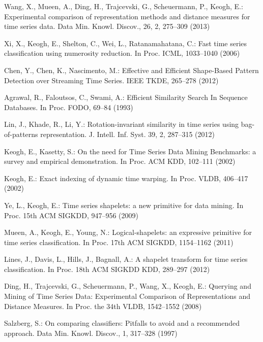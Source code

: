 \documentclass{llncs}
\begin{document}
\begin{thebibliography}{5}


Wang, X., Mueen, A., Ding, H., Trajcevski, G., Scheuermann, P., Keogh, E.:
Experimental comparison of representation methods and distance measures for time series data.
Data Min. Knowl. Discov., 26, 2, 275--309 (2013)

Xi, X., Keogh, E., Shelton, C., Wei, L., Ratanamahatana, C.:
Fast time series classification using numerosity reduction. 
In Proc. ICML, 1033--1040 (2006)

Chen, Y., Chen, K., Nascimento, M.:
Effective and Efficient Shape-Based Pattern Detection over Streaming Time Series. 
IEEE TKDE, 265--278 (2012)

Agrawal, R., Faloutsos, C., Swami, A.:
Efficient Similarity Search In Sequence Databases.
In Proc. FODO, 69--84 (1993)

Lin, J., Khade, R., Li, Y.:
Rotation-invariant similarity in time series using bag-of-patterns representation. 
J. Intell. Inf. Syst. 39, 2, 287--315 (2012)

Keogh, E., Kasetty, S.:
On the need for Time Series Data Mining Benchmarks: a survey and empirical demonstration.
In Proc. ACM KDD, 102--111 (2002)

Keogh, E.:
Exact indexing of dynamic time warping. 
In Proc. VLDB, 406--417 (2002)

Ye, L., Keogh, E.:
Time series shapelets: a new primitive for data mining.
In Proc. 15th ACM SIGKDD, 947--956 (2009)

Mueen, A., Keogh, E., Young, N.:
Logical-shapelets: an expressive primitive for time series classification.
In Proc. 17th ACM SIGKDD, 1154--1162 (2011)

Lines, J., Davis, L., Hills, J., Bagnall, A.:
A shapelet transform for time series classification. 
In Proc. 18th ACM SIGKDD KDD, 289--297 (2012)

Ding, H., Trajcevski, G., Scheuermann, P., Wang, X., Keogh, E.:
Querying and Mining of Time Series Data: Experimental Comparison of Representations and Distance
Measures. 
In Proc. the 34th VLDB, 1542--1552 (2008)

Salzberg, S.:
On comparing classifiers: Pitfalls to avoid and a recommended approach. 
Data Min. Knowl. Discov., 1, 317--328 (1997)


\end{thebibliography}
\end{document}
